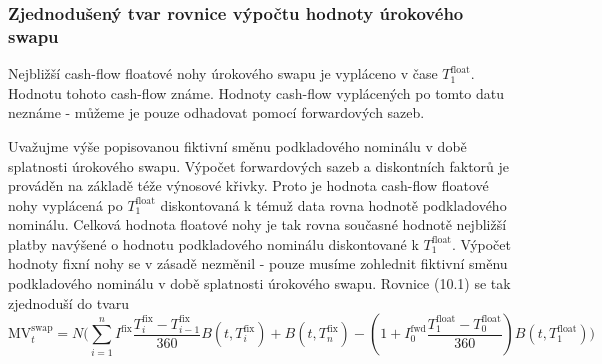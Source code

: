 \documentclass[a4paper]{book}
\begin{document}
\subsubsection{Zjednodušený tvar rovnice výpočtu hodnoty úrokového swapu}

Nejbližší cash-flow floatové nohy úrokového swapu je vypláceno v čase $T_1^{\mathrm{float}}$. Hodnotu tohoto cash-flow známe. Hodnoty cash-flow vyplácených po tomto datu neznáme - můžeme je pouze odhadovat pomocí forwardových sazeb.

Uvažujme výše popisovanou fiktivní směnu podkladového nominálu v době splatnosti úrokového swapu. Výpočet forwardových sazeb a diskontních faktorů je prováděn na základě téže výnosové křivky. Proto je hodnota cash-flow floatové nohy vyplácená po $T_1^{\mathrm{float}}$ diskontovaná k témuž data rovna hodnotě podkladového nominálu. Celková hodnota floatové nohy je tak rovna současné hodnotě nejbližší platby navýšené o hodnotu podkladového nominálu diskontované k $T_1^{\mathrm{float}}$. Výpočet hodnoty fixní nohy se v zásadě nezměnil - pouze musíme zohlednit fiktivní směnu podkladového nominálu v době splatnosti úrokového swapu. Rovnice (10.1) se tak zjednoduší do tvaru
\begin{equation}
\mathrm{MV}_t^{\mathrm{swap}} = N \Bigg( \sum_{i=1}^n I^{\mathrm{fix}} \frac{T_i^{\mathrm{fix}}-T_{i-1}^{\mathrm{fix}}}{360}B(t,T_i^{\mathrm{fix}}) + B(t, T_n^{\mathrm{fix}}) - (1 + I_0^{\mathrm{fwd}}\frac{T_1^{\mathrm{float}} - T_0^{\mathrm{float}}}{360})B(t,T_1^{\mathrm{float}}) \Bigg)
\end{equation}
\end{document}
